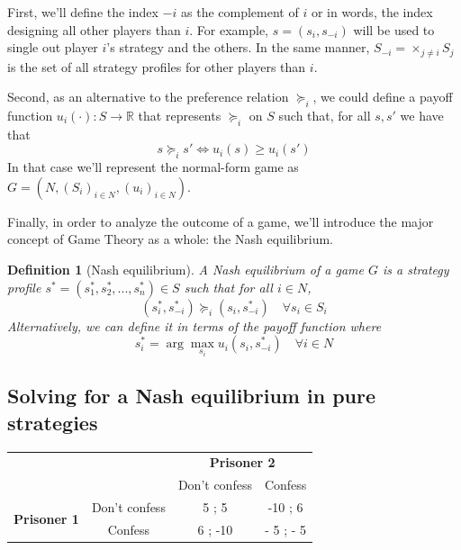\documentclass[12pt]{report}
\newtheorem{definition}{Definition}[chapter]
\begin{document}
First, we'll define the index $-i$ as the complement of $i$ or in words, the index designing all other players than $i$. For example, $s = (s_i, s_{-i})$ will be used to single out player $i$'s strategy and the others. In the same manner, $S_{-i} = \times_{j\neq i} S_j$ is the set of all strategy profiles for other players than $i$.

Second, as an alternative to the preference relation $\succeq_i$, we could define a payoff function $u_i(\cdot) : S\to \mathbb{R}$ that represents $\succeq_i$ on $S$ such that, for all $s, s'$ we have that $$s \succeq_i s' \Leftrightarrow u_i(s)\geq u_i(s')$$In that case we'll represent the normal-form game as $G = (N, (S_i)_{i\in N}, (u_i)_{i\in N})$.

Finally, in order to analyze the outcome of a game, we'll introduce the major concept of Game Theory as a whole: the Nash equilibrium.

\begin{definition}[Nash equilibrium]
A Nash equilibrium of a game $G$ is a strategy profile $s^* = (s_1^*, s_2^*, ..., s_n^*) \in S$ such that for all $i\in N$, $$(s_i^*, s_{-i}^*)\succeq_i (s_i, s_{-i}^*) \quad \forall s_i\in S_i $$Alternatively, we can define it in terms of the payoff function where $$ s_i^* = \operatorname{arg}\max_{s_i} u_i(s_i, s_{-i}^*) \quad \forall i\in N$$
\end{definition}

\subsection{Solving for a Nash equilibrium in pure strategies}

\begin{table}[ht!]
\centering
\begin{tabular}{cccc}
 &  & \multicolumn{2}{c}{\textbf{Prisoner 2}} \\ \cline{3-4} 
 & \multicolumn{1}{c|}{} & \multicolumn{1}{c|}{Don't confess} & \multicolumn{1}{c|}{Confess} \\ \cline{2-4} 
\multicolumn{1}{c|}{\multirow{2}{*}{\textbf{Prisoner 1}}} & \multicolumn{1}{c|}{Don't confess} & \multicolumn{1}{c|}{5 ; 5} & \multicolumn{1}{c|}{-10 ; 6} \\ \cline{2-4} 
\multicolumn{1}{c|}{} & \multicolumn{1}{c|}{Confess} & \multicolumn{1}{c|}{6 ; -10} & \multicolumn{1}{c|}{- 5 ; - 5} \\ \cline{2-4} 
\end{tabular}
\end{table}
\end{document}
